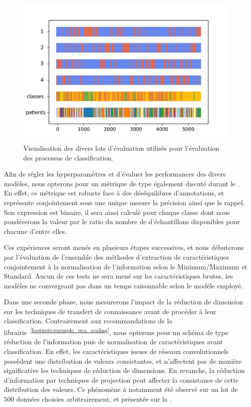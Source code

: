 \begin{figure}[H]
    \centering
    \includegraphics[width=0.9\linewidth]{contents/chapter_4/resources/visualisation_folds.png}
    \caption{Visualisation des divers lots d'évaluation utilisés pour l'évaluation des processus de classification.}
    \label{fig:visualisation_folds}
\end{figure}\par

Afin de régler les hyperparamètres et d'évaluer les performances des divers modèles, nous opterons pour un métrique de type \fscore également discuté durant le . En effet, ce métrique est robuste face à des déséquilibres d'annotations, et représente conjointement sous une unique mesure la précision ainsi que le rappel. Son expression est binaire, il sera ainsi calculé pour chaque classe dont nous pondérerons la valeur par le ratio du nombre de d'échantillons disponibles pour chacune d'entre elles.\par

Ces expériences seront menés en plusieurs étapes successives, et nous débuterons par l'évaluation de l'ensemble des méthodes d'extraction de caractéristiques conjointement à la normalisation de l'information selon le Minimum/Maximum et Standard. Aucun de ces tests ne sera mené sur les caractéristiques brutes, les modèles ne convergeant pas dans un temps raisonnable selon le modèle employé.\par

Dans une seconde phase, nous mesurerons l'impact de la réduction de dimension sur les techniques de transfert de connaissance avant de procéder à leur classification. Contrairement aux recommandations de la librairie~\textsuperscript{\ref{footnote:exemple_pca_scaling}}, nous opterons pour un schéma de type réduction de l'information puis de normalisation de caractéristiques avant classification. En effet, les caractéristiques issues de réseaux convolutionnels possèdent une distribution de valeurs consistantes, et n'affectent pas de manière significative les techniques de réduction de dimensions. En revanche, la réduction d'information par techniques de projection peut affecter la consistance de cette distribution des valeurs. Ce phénomène à notamment été observé sur un lot de 500 données choisies arbitrairement, et présentée sur la .\par

